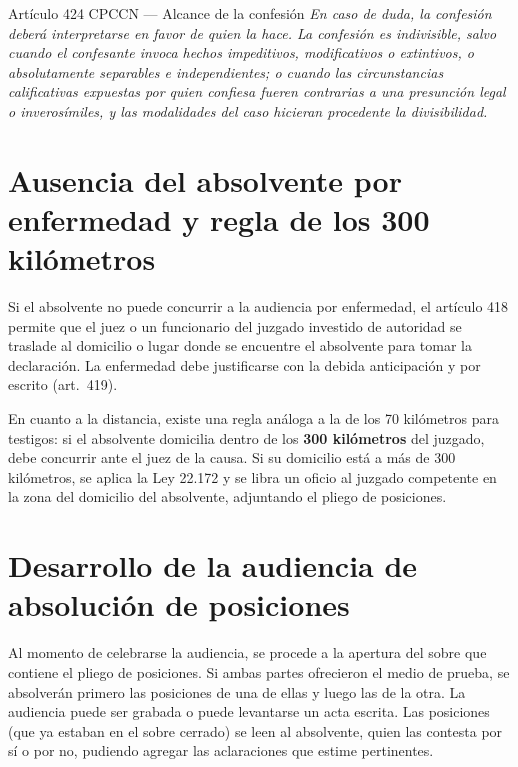\documentclass[12pt,oneside]{book}
\begin{document}
\begin{norma}{Artículo 424 CPCCN --- Alcance de la confesión}
\textit{En caso de duda, la confesión deberá interpretarse en favor de quien la hace. La confesión es indivisible, salvo cuando el confesante invoca hechos impeditivos, modificativos o extintivos, o absolutamente separables e independientes; o cuando las circunstancias calificativas expuestas por quien confiesa fueren contrarias a una presunción legal o inverosímiles, y las modalidades del caso hicieran procedente la divisibilidad.}
\end{norma}

\section{Ausencia del absolvente por enfermedad y regla de los 300 kilómetros}

Si el absolvente no puede concurrir a la audiencia por enfermedad, el artículo 418 permite que el juez o un funcionario del juzgado investido de autoridad se traslade al domicilio o lugar donde se encuentre el absolvente para tomar la declaración. La enfermedad debe justificarse con la debida anticipación y por escrito (art.~419).

En cuanto a la distancia, existe una regla análoga a la de los 70 kilómetros para testigos: si el absolvente domicilia dentro de los \textbf{300 kilómetros} del juzgado, debe concurrir ante el juez de la causa. Si su domicilio está a más de 300 kilómetros, se aplica la Ley 22.172 y se libra un oficio al juzgado competente en la zona del domicilio del absolvente, adjuntando el pliego de posiciones.

\section{Desarrollo de la audiencia de absolución de posiciones}

Al momento de celebrarse la audiencia, se procede a la apertura del sobre que contiene el pliego de posiciones. Si ambas partes ofrecieron el medio de prueba, se absolverán primero las posiciones de una de ellas y luego las de la otra. La audiencia puede ser grabada o puede levantarse un acta escrita. Las posiciones (que ya estaban en el sobre cerrado) se leen al absolvente, quien las contesta por sí o por no, pudiendo agregar las aclaraciones que estime pertinentes.
\end{document}
